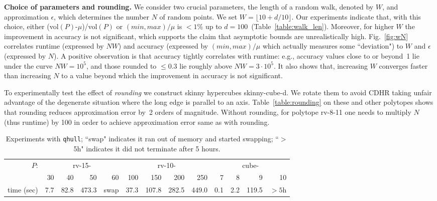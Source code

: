 \documentclass[11pt,a4paper]{article}
\def\vol{\mbox{vol}}
\def\vol{\mbox{vol}}
\begin{document}
\textbf{Choice of parameters and rounding.}
We consider two crucial parameters,  
the length of a random walk, denoted by $W$, and approximation
$\epsilon$, which determines the number $N$ of random points. 
We set $W=\lfloor 10+d/10\rfloor$.
Our experiments indicate that, with this choice, either
(\vol$(P)$-$\mu$)/\vol$(P)$ or $(min, max)/\mu$ is $<1\%$
up to $d= 100$~(Table~\ref{table:walk_len}). 
Moreover, for higher $W$ the improvement in accuracy is not significant,
which supports the claim that asymptotic bounds are unrealistically high.
Fig.~\ref{fig:wN} correlates runtime (expressed by $NW$) and
accuracy (expressed by $(min, max)/\mu$ which actually measures 
some ``deviation") to $W$ and $\epsilon$ (expressed by $N$).
A positive observation is that accuracy tightly correlates with runtime:
e.g., accuracy values close to or beyond~1 lie under the curve $NW=10^5$,
and those rounded to $\le 0.3$ lie roughly above $NW=3\cdot 10^5$.
It also shows that,
increasing $W$ converges faster than increasing $N$ to a value beyond which the improvement in accuracy is not significant.

To experimentally test the effect of {\it rounding} we construct skinny
hypercubes skinny-cube-d.  
We rotate them to avoid CDHR taking unfair advantage of the degenerate
situation where the long edge is parallel to an axis. 
Table~\ref{table:rounding} on these and other polytopes shows that
rounding reduces approximation error by~2 orders of magnitude.
Without rounding, for polytope rv-8-11
one needs to multiply $N$ (thus runtime) by 100 in order to achieve 
approximation error same as with rounding.  



\begin{table}[t]\centering\footnotesize
\begin{tabular}{r|rrrr|rrrr|rrrr}
\multirow{2}{.5cm}{$P$:} & \multicolumn{4}{c}{rv-15-} & \multicolumn{4}{c}{rv-10-} & \multicolumn{4}{c}{cube-} \\
& 30 & 40 & 50 & 60 & 100 & 150 & 200 & 250 & 7 & 8 & 9 & 10 \\\hline time (sec) & 7.7 & 82.8 & 473.3 & swap & 37.3 & 107.8 & 282.5 & 449.0 & 0.1 & 2.2 & 119.5 & $>5$h\\
\end{tabular} 
\caption{ Experiments with {\tt qhull}; ``swap" indicates it
ran out of memory and started swapping; ``$>$5h" indicates it did not
terminate after 5 hours.  \label{table:qhull_vol}}
\end{table}
\end{document}
